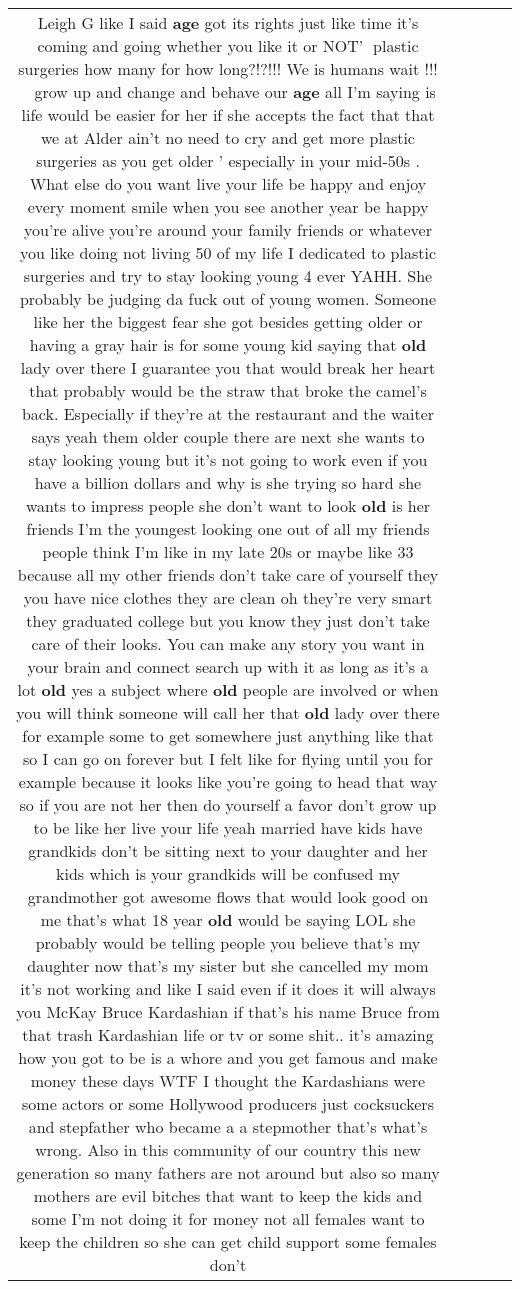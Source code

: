\documentclass[11pt]{article}
\newlength\mylength
\begin{document}
\begin{center}
\begin{longtable}{|C{.65\mylength}|C{.30\mylength}|C{.12\mylength}|C{.12\mylength}|C{.12\mylength}|}
  \small Leigh G like I said \textbf{age} got its rights just like time it's coming and going whether you like it or NOT'👊 plastic surgeries how many for how long?!?!!! We is humans wait !!!🤣🤣 grow up and change and behave our \textbf{age} all I'm saying is life would be easier for her if she accepts the fact that that we at Alder ain't no need to cry and get more plastic surgeries as you get older ' especially in your mid-50s . What else do you want live your life be happy and enjoy every moment smile when you see another year be happy you're alive you're around your family friends or whatever you like doing not living 50 of my life I dedicated to plastic surgeries and try to stay looking young 4 ever YAHH. She probably be judging da fuck out of young women. Someone like her the biggest fear she got besides getting older or having a gray hair is for some young kid saying that \textbf{old} lady over there I guarantee you that would break her heart that probably would be the straw that broke the camel's back. Especially if they're at the restaurant and the waiter says yeah them older couple there are next she wants to stay looking young but it's not going to work even if you have a billion dollars and why is she trying so hard she wants to impress people she don't want to look \textbf{old} is her friends I'm the youngest looking one out of all my friends people think I'm like in my late 20s or maybe like 33 because all my other friends don't take care of yourself they you have nice clothes they are clean oh they're very smart they graduated college but you know they just don't take care of their looks. You can make any story you want in your brain and connect search up with it as long as it's a lot \textbf{old} yes a subject where \textbf{old} people are involved or when you will think someone will call her that \textbf{old} lady over there for example some to get somewhere just anything like that so I can go on forever but I felt like for flying until you for example because it looks like you're going to head that way so if you are not her then do yourself a favor don't grow up to be like her live your life yeah married have kids have grandkids don't be sitting next to your daughter and her kids which is your grandkids will be confused my grandmother got awesome flows that would look good on me that's what 18 year \textbf{old} would be saying LOL she probably would be telling people you believe that's my daughter now that's my sister but she cancelled my mom it's not working and like I said even if it does it will always you McKay Bruce Kardashian if that's his name Bruce from that trash  Kardashian life or tv or some shit.. it's amazing how you got to be is a whore and you get famous and make money these days WTF I thought the Kardashians were some actors or some Hollywood producers just cocksuckers and stepfather who became a a stepmother that's what's wrong. Also in this community of our country this new generation so many fathers are not around but also so many mothers are evil bitches that want to keep the kids and some I'm not doing it for money not all females want to keep the children so she can get child support some females don't 
\end{longtable}
\end{center}
\end{document}
